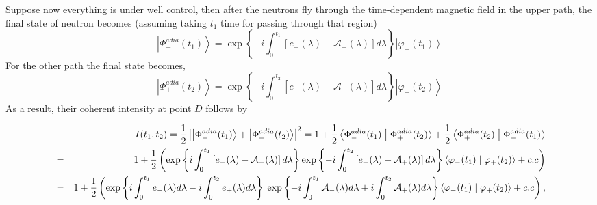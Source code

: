\documentclass[aps,pra,twocolumn,
groupedaddress,10pt]{revtex4}
\def\be{\begin{equation}} \def\ee{\end{equation}}
\def\bea{\begin{eqnarray}} \def\eea{\end{eqnarray}}
\begin{document}
Suppose now everything is under well control, then after the neutrons fly through the
time-dependent magnetic field in the upper path, the final state of neutron
becomes (assuming taking $t_1$ time for passing through that region)
\be
\left| {\Phi _ - ^{adia} (t_1 )} \right\rangle  = \exp \left\{ { - i\int_0^{t_1 } {\left[ {e_ -  (\lambda ) - \mathcal{A}_-(\lambda )} \right]d\lambda } } \right\}\left| {\varphi _ -  (t_1 )} \right\rangle
\ee
For the other path the final state becomes,
\be
\left| {\Phi _ + ^{adia} (t_2 )} \right\rangle  = \exp \left\{ { - i\int_0^{t_2 } {\left[ {e_ +  (\lambda ) - \mathcal{A}_+(\lambda )} \right]d\lambda } } \right\}\left| {\varphi _ +  (t_2 )} \right\rangle
\ee
As a result, their coherent intensity at point $D$ follows by
\begin{widetext}
\bea
&& I(t_1 ,t_2 ) =\frac{1}{2} \left| {\left| {\Phi _ - ^{adia} (t_1 )} \right\rangle  + \left| {\Phi _ + ^{adia} (t_2 )} \right\rangle } \right|^2
  = 1 +\frac{1}{2} \left\langle {{\Phi _ - ^{adia} (t_1 )}}
 \mathrel{\left | {\vphantom {{\Phi _ - ^{adia} (t_1 )} {\Phi _ + ^{adia} (t_2 )}}}
 \right. \kern-\nulldelimiterspace}{{\Phi _ + ^{adia} (t_2 )}} \right\rangle  +
 \frac{1}{2} \left\langle {{\Phi _ + ^{adia} (t_2 )}}
 \mathrel{\left | {\vphantom {{\Phi _ + ^{adia} (t_2 )} {\Phi _ - ^{adia} (t_1 )}}}
 \right. \kern-\nulldelimiterspace}
 {{\Phi _ - ^{adia} (t_1 )}} \right\rangle  \nonumber \\
  &=& 1 + \frac{1}{2} \left( {\exp \left\{ {i\int_0^{t_1 } {\left[ {e_ -  (\lambda ) - \mathcal{A}_- (\lambda )} \right]d\lambda } } \right\}\exp \left\{ { - i\int_0^{t_2 } {\left[ {e_ +  (\lambda ) - \mathcal{A}_+ (\lambda )} \right]d\lambda } } \right\}\left\langle {{\varphi _ -  (t_1 )}}
 \mathrel{\left | {\vphantom {{\varphi _ -  (t_1 )} {\varphi _ +  (t_2 )}}}
 \right. \kern-\nulldelimiterspace}
 {{\varphi _ +  (t_2 )}} \right\rangle  + c.c} \right) \nonumber\\
  &=& 1 + \frac{1}{2} \left( {\exp \left\{ {i\int_0^{t_1 } {e_ -  (\lambda )d\lambda }  - i\int_0^{t_2 } {e_ +  (\lambda )d\lambda } } \right\} } \right. \left. {\exp \left\{ { - i\int_0^{t_1 } {\mathcal{A}_- (\lambda )d\lambda }  + i\int_0^{t_2 } {\mathcal{A}_+ (\lambda )d\lambda } } \right\}\left\langle {{\varphi _ -  (t_1 )}}
 \mathrel{\left | {\vphantom {{\varphi _ -  (t_1 )} {\varphi _ +  (t_2 )}}}
 \right. \kern-\nulldelimiterspace}
 {{\varphi _ +  (t_2 )}} \right\rangle  + c.c} \right), \nonumber \\ \label{coherence1}
 \eea
 \end{widetext}
\end{document}
